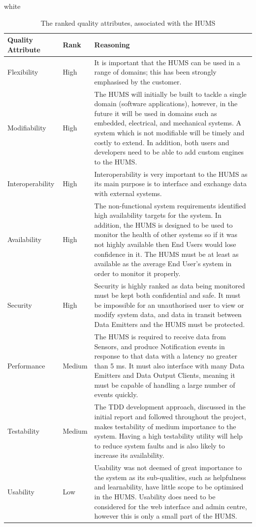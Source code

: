 \documentclass[10pt,a4paper]{article}
\newcommand{\tableformat}[4]{
\begin{table}[t]
\centering
  \rowcolors{2}{gray!10} {white}
\begin{tabular}{#1}
  \hline
  \rowcolor[gray]{0.9} #2
\end{tabular}
\caption{#3}
\label{#4}
\end{table}}
\begin{document}
\tableformat{p{2.4cm} p{1.2cm} p{11.2cm}}{
\hline
Quality \qquad Attribute & Rank & Reasoning \\
\hline
Flexibility & High & It is important that the HUMS can be used in a range of domains; this has been strongly emphasised by the customer. 
\\
Modifiability & High & The HUMS will initially be built to tackle a single domain (software applications), however, in the future it will be used in domains such as embedded, electrical, and mechanical systems. A system which is not modifiable will be timely and costly to extend. In addition, both users and developers need to be able to add custom engines to the HUMS.
\\
Interoperability & High & Interoperability is very important to the HUMS as its main purpose is to interface and exchange data with external systems. 
\\
Availability & High & The non-functional system requirements identified high availability targets for the system. In addition, the HUMS is designed to be used to monitor the health of other systems so if it was not highly available then End Users would lose confidence in it. The HUMS must be at least as available as the average End User's system in order to monitor it properly. 
\\
Security & High & Security is highly ranked as data being monitored must be kept both confidential and safe. It must be impossible for an unauthorised user to view or modify system data, and data in transit between Data Emitters and the HUMS must be protected.
\\
Performance & Medium & The HUMS is required to receive data from Sensors, and produce Notification events in response to that data with a latency no greater than 5 ms. It must also interface with many Data Emitters and Data Output Clients, meaning it must be capable of handling a large number of events quickly.
\\
Testability & Medium & The TDD development approach, discussed in the initial report and followed throughout the project, makes testability of medium importance to the system. Having a high testability utility will help to reduce system faults and is also likely to increase its availability. 
\\
Usability & Low & Usability was not deemed of great importance to the system as its sub-qualities, such as helpfulness and learnability, have little scope to be optimised in the HUMS. Usability does need to be considered for the web interface and admin centre, however this is only a small part of the HUMS.
\\
}{The ranked quality attributes, associated with the HUMS}{tab:qualities}
\end{document}
